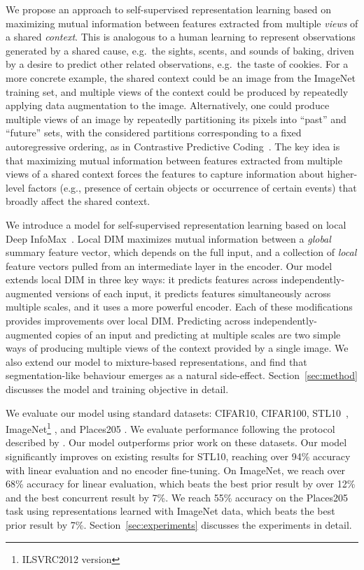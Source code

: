 \documentclass{article}
\begin{document}
We propose an approach to self-supervised representation learning based on maximizing mutual information between features extracted from multiple \emph{views} of a shared \emph{context}.
This is analogous to a human learning to represent observations generated by a shared cause, e.g.~the sights, scents, and sounds of baking, driven by a desire to predict other related observations, e.g.~the taste of cookies.
For a more concrete example, the shared context could be an image from the ImageNet training set, and multiple views of the context could be produced by repeatedly applying data augmentation to the image.
Alternatively, one could produce multiple views of an image by repeatedly partitioning its pixels into ``past'' and ``future'' sets, with the considered partitions corresponding to a fixed autoregressive ordering, as in Contrastive Predictive Coding~\citep[CPC,][]{vandenOord2018}.
The key idea is that maximizing mutual information between features extracted from multiple views of a shared context forces the features to capture information about higher-level factors (e.g., presence of certain objects or occurrence of certain events) that broadly affect the shared context.

We introduce a model for self-supervised representation learning based on local Deep InfoMax~\citep[DIM,][]{Hjelm2019}.
Local DIM maximizes mutual information between a \emph{global} summary feature vector, which depends on the full input, and a collection of \emph{local} feature vectors pulled from an intermediate layer in the encoder.
Our model extends local DIM in three key ways: it predicts features across independently-augmented versions of each input, it predicts features simultaneously across multiple scales, and it uses a more powerful encoder.
Each of these modifications provides improvements over local DIM.
Predicting across independently-augmented copies of an input and predicting at multiple scales are two simple ways of producing multiple views of the context provided by a single image.
We also extend our model to mixture-based representations, and find that segmentation-like behaviour emerges as a natural side-effect.
Section~\ref{sec:method} discusses the model and training objective in detail.

We evaluate our model using standard datasets: CIFAR10, CIFAR100, STL10~\citep{Coates2011}, ImageNet\footnote{ILSVRC2012 version} \citep{Russakovsky2015}, and Places205 \citep{Zhou2014}.
We evaluate performance following the protocol described by \citet{Kolesnikov2019}.
Our model outperforms prior work on these datasets.
Our model significantly improves on existing results for STL10, reaching over 94\% accuracy with linear evaluation and no encoder fine-tuning.
On ImageNet, we reach over 68\% accuracy for linear evaluation, which beats the best prior result by over 12\% and the best concurrent result by 7\%.
We reach 55\% accuracy on the Places205 task using representations learned with ImageNet data, which beats the best prior result by 7\%.
Section~\ref{sec:experiments} discusses the experiments in detail.
\end{document}
